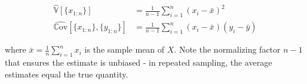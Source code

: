 \begin{equation}
\begin{aligned}
\hat{\mathbb{V}}[\{x_{1:n}\}] &= \frac{1}{n-1} \sum_{i=1}^n \left( x_i - \bar{x} \right)^2 \\
\hat{\mathbb{C}\text{ov}}[\{x_{1:n}\},\{y_{1:n}\}] &= \frac{1}{n-1} \sum_{i=1}^n ( x_i - \bar{x})(y_i - \bar{y})
\end{aligned}
\end{equation}

where $\bar{x} = \frac{1}{n} \sum_{i=1}^{n} x_i$ is the sample mean of $X$. Note the normalizing factor $n-1$ that ensures the estimate is unbiased - in repeated sampling, the average estimates equal the true quantity. 

